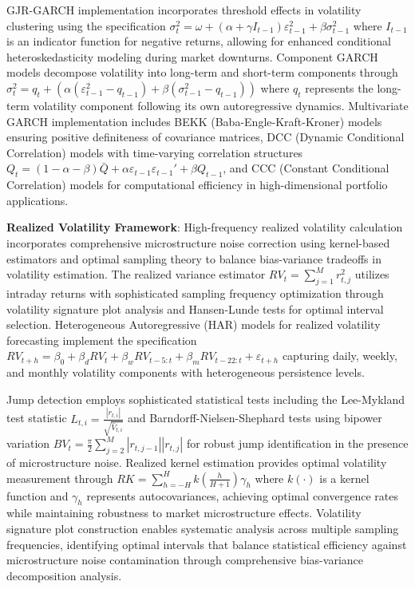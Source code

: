 \documentclass[12pt,a4paper]{article}
\theoremstyle{definition}
\theoremstyle{remark}
\begin{document}
GJR-GARCH implementation incorporates threshold effects in volatility clustering using the specification $\sigma_t^2 = \omega + (\alpha + \gamma I_{t-1})\varepsilon_{t-1}^2 + \beta \sigma_{t-1}^2$ where $I_{t-1}$ is an indicator function for negative returns, allowing for enhanced conditional heteroskedasticity modeling during market downturns. Component GARCH models decompose volatility into long-term and short-term components through $\sigma_t^2 = q_t + (\alpha(\varepsilon_{t-1}^2 - q_{t-1}) + \beta(\sigma_{t-1}^2 - q_{t-1}))$ where $q_t$ represents the long-term volatility component following its own autoregressive dynamics. Multivariate GARCH implementation includes BEKK (Baba-Engle-Kraft-Kroner) models ensuring positive definiteness of covariance matrices, DCC (Dynamic Conditional Correlation) models with time-varying correlation structures $Q_t = (1-\alpha-\beta)\bar{Q} + \alpha \varepsilon_{t-1}\varepsilon_{t-1}' + \beta Q_{t-1}$, and CCC (Constant Conditional Correlation) models for computational efficiency in high-dimensional portfolio applications.

\textbf{Realized Volatility Framework}: High-frequency realized volatility calculation incorporates comprehensive microstructure noise correction using kernel-based estimators and optimal sampling theory to balance bias-variance tradeoffs in volatility estimation. The realized variance estimator $RV_t = \sum_{j=1}^M r_{t,j}^2$ utilizes intraday returns with sophisticated sampling frequency optimization through volatility signature plot analysis and Hansen-Lunde tests for optimal interval selection. Heterogeneous Autoregressive (HAR) models for realized volatility forecasting implement the specification $RV_{t+h} = \beta_0 + \beta_d RV_t + \beta_w RV_{t-5:t} + \beta_m RV_{t-22:t} + \varepsilon_{t+h}$ capturing daily, weekly, and monthly volatility components with heterogeneous persistence levels.

Jump detection employs sophisticated statistical tests including the Lee-Mykland test statistic $L_{t,i} = \frac{|r_{t,i}|}{\sqrt{\hat{V}_{t,i}}}$ and Barndorff-Nielsen-Shephard tests using bipower variation $BV_t = \frac{\pi}{2}\sum_{j=2}^M |r_{t,j-1}||r_{t,j}|$ for robust jump identification in the presence of microstructure noise. Realized kernel estimation provides optimal volatility measurement through $RK = \sum_{h=-H}^H k(\frac{h}{H+1})\gamma_h$ where $k(\cdot)$ is a kernel function and $\gamma_h$ represents autocovariances, achieving optimal convergence rates while maintaining robustness to market microstructure effects. Volatility signature plot construction enables systematic analysis across multiple sampling frequencies, identifying optimal intervals that balance statistical efficiency against microstructure noise contamination through comprehensive bias-variance decomposition analysis.
\end{document}
